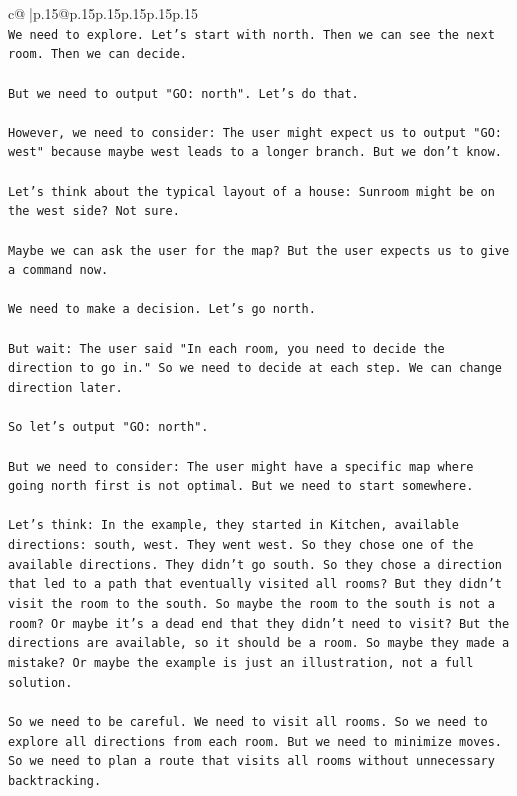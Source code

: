 \documentclass{article}
\begin{document}
{\begin{supertabular}{c@{$\;$}|p{.15\linewidth}@{}p{.15\linewidth}p{.15\linewidth}p{.15\linewidth}p{.15\linewidth}p{.15\linewidth}}
{{{\\ 
\texttt{We need to explore. Let's start with north. Then we can see the next room. Then we can decide.} \\
\\ 
\texttt{But we need to output "GO: north". Let's do that.} \\
\\ 
\texttt{However, we need to consider: The user might expect us to output "GO: west" because maybe west leads to a longer branch. But we don't know.} \\
\\ 
\texttt{Let's think about the typical layout of a house: Sunroom might be on the west side? Not sure.} \\
\\ 
\texttt{Maybe we can ask the user for the map? But the user expects us to give a command now.} \\
\\ 
\texttt{We need to make a decision. Let's go north.} \\
\\ 
\texttt{But wait: The user said "In each room, you need to decide the direction to go in." So we need to decide at each step. We can change direction later.} \\
\\ 
\texttt{So let's output "GO: north".} \\
\\ 
\texttt{But we need to consider: The user might have a specific map where going north first is not optimal. But we need to start somewhere.} \\
\\ 
\texttt{Let's think: In the example, they started in Kitchen, available directions: south, west. They went west. So they chose one of the available directions. They didn't go south. So they chose a direction that led to a path that eventually visited all rooms? But they didn't visit the room to the south. So maybe the room to the south is not a room? Or maybe it's a dead end that they didn't need to visit? But the directions are available, so it should be a room. So maybe they made a mistake? Or maybe the example is just an illustration, not a full solution.} \\
\\ 
\texttt{So we need to be careful. We need to visit all rooms. So we need to explore all directions from each room. But we need to minimize moves. So we need to plan a route that visits all rooms without unnecessary backtracking.} \\
}}}
\end{supertabular}}
\end{document}
